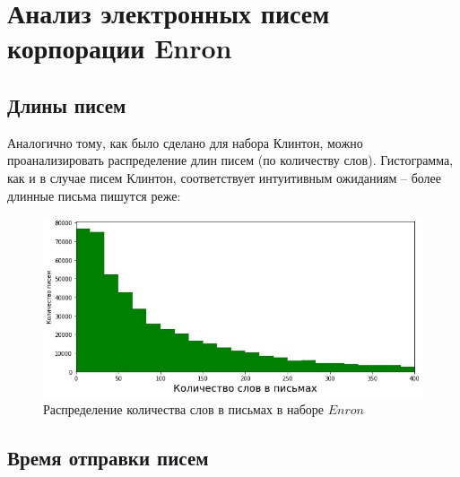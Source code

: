 \section{Анализ электронных писем корпорации Enron}

\subsection{Длины писем}

Аналогично тому, как было сделано для набора Клинтон, можно проанализировать распределение длин
писем (по количеству слов). 
Гистограмма, как и в случае писем Клинтон, соответствует интуитивным ожиданиям -- более длинные письма пишутся реже:

\begin{figure}[H]
\centering
\includegraphics[scale=0.75]{pics/enron_emails_words_count.jpg}
\caption{Распределение количества слов в письмах в наборе $Enron$}
\end{figure}



\subsection{Время отправки писем}

